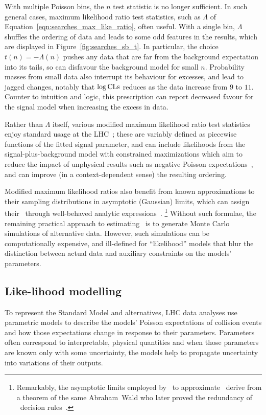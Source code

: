 With multiple Poisson bins, the $n$ test statistic is no longer
sufficient.
In such general cases, maximum likelihood ratio test statistics,
such as $\Lambda$ of Equation~\ref{eqn:searches_max_like_ratio}, often useful.
With a single bin, $\Lambda$ shuffles the ordering of
data and leads to some odd features in the results, which are displayed in
Figure~\ref{fig:searches_sb_t}.
In particular, the choice $t(n) = -\Lambda(n)$ pushes any data that are far
from the background expectation into its tails, so can disfavour the background
model for small $n$.
Probability masses from small data also interrupt its behaviour for excesses,
and lead to jagged changes, notably that $\log\mathrm{CLs}$ reduces as the data
increase from $9$ to $11$.
Counter to intuition and logic, this prescription can report decreased favour
for the signal model when increasing the excess in data.

Rather than $\Lambda$ itself, various modified maximum likelihood ratio test
statistics enjoy standard usage at the LHC~\cite{cern2011procedure};
these are variably defined as piecewise functions of the fitted signal
parameter, and can include likelihoods from the signal-plus-background
model with constrained maximizations which aim to reduce the impact of
unphysical results such as negative Poisson expectations~\cite{
Feldman:1997qc,
Cowan:2010js
},
and can improve (in a context-dependent sense) the resulting ordering.

Modified maximum likelihood ratios also benefit from known approximations to
their sampling distributions in asymptotic (Gaussian) limits,
which can assign their \pvalues\ through well-behaved analytic
expressions~\cite{
Cowan:2010js,
wilks1938large,
wald1943tests
}.%
\footnote{%
Remarkably, the asymptotic limits employed by~\cite{Cowan:2010js} to
approximate \pvalues\ derive from a theorem of the same Abraham~Wald who later
proved the redundancy of \pvalue\ decision rules~\cite{wald1947bayes}.%
}
Without such formulae, the remaining practical approach to estimating
\pvalues\ is to generate Monte Carlo simulations of alternative data.
However, such simulations can be computationally expensive, and ill-defined for
``likelihood'' models that blur the distinction between actual data and
auxiliary constraints on the models' parameters.


\subsection{Like-lihood modelling}
To represent the Standard Model and alternatives, LHC data analyses use
parametric models to describe the models' Poisson expectations of
collision events and how those expectations change in response to their
parameters.
Parameters often correspond to interpretable, physical quantities and when
those parameters are known only with some uncertainty, the models help to
propagate uncertainty into variations of their outputs.

